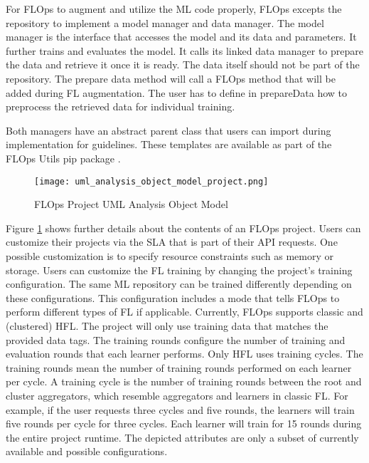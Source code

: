 For FLOps to augment and utilize the ML code properly, FLOps excepts the repository to implement a model manager and data manager.
The model manager is the interface that accesses the model and its data and parameters.
It further trains and evaluates the model.
It calls its linked data manager to prepare the data and retrieve it once it is ready.
The data itself should not be part of the repository.
The prepare data method will call a FLOps method that will be added during FL augmentation.
The user has to define in prepareData how to preprocess the retrieved data for individual training.

Both managers have an abstract parent class that users can import during implementation for guidelines.
These templates are available as part of the FLOps Utils pip package \cite{flops_utils_pip}.

\begin{figure}[h]
    \centering
    \texttt{[image: uml\_analysis\_object\_model\_project.png]}
    \caption{FLOps Project UML Analysis Object Model}
    \label{fig:uml_project_analysis_object_model}
\end{figure}

Figure \ref{fig:uml_project_analysis_object_model} shows further details about the contents of an FLOps project.
Users can customize their projects via the SLA that is part of their API requests.
One possible customization is to specify resource constraints such as memory or storage.
Users can customize the FL training by changing the project's training configuration.
The same ML repository can be trained differently depending on these configurations.
This configuration includes a mode that tells FLOps to perform different types of FL if applicable.
Currently, FLOps supports classic and (clustered) HFL.
The project will only use training data that matches the provided data tags.
The training rounds configure the number of training and evaluation rounds that each learner performs.
Only HFL uses training cycles.
The training rounds mean the number of training rounds performed on each learner per cycle.
A training cycle is the number of training rounds between the root and cluster aggregators, which resemble aggregators and learners in classic FL.
For example, if the user requests three cycles and five rounds, the learners will train five rounds per cycle for three cycles.
Each learner will train for 15 rounds during the entire project runtime.
The depicted attributes are only a subset of currently available and possible configurations.

